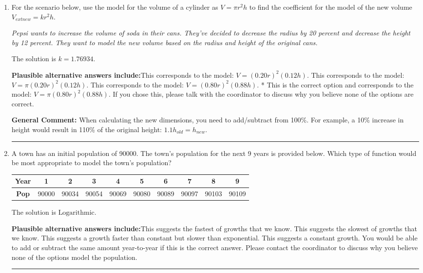 \documentclass{extbook}[14pt]
\newcommand{\litem}[1]{\item #1

\rule{\textwidth}{0.4pt}}
\begin{document}
\begin{enumerate}\litem{
For the scenario below, use the model for the volume of a cylinder as $V = \pi r^2 h$ to find the coefficient for the model of the new volume $V_{	ext{new}} = k r^2 h$.

\begin{center}
    \textit{ Pepsi wants to increase the volume of soda in their cans. They've decided to decrease the radius by 20 percent and decrease the height by 12 percent. They want to model the new volume based on the radius and height of the original cans. }
\end{center}
The solution is \( k = 1.76934 \).\begin{enumerate}[label=\Alph*.]
\textbf{Plausible alternative answers include:}This corresponds to the model: $V = (0.20 r)^2 (0.12 h)$.
This corresponds to the model: $V = \pi (0.20 r)^2 (0.12 h)$.
This corresponds to the model: $V = (0.80 r)^2 (0.88 h)$.
* This is the correct option and corresponds to the model: $V = \pi (0.80 r)^2 (0.88 h)$.
If you chose this, please talk with the coordinator to discuss why you believe none of the options are correct.
\end{enumerate}

\textbf{General Comment:} When calculating the new dimensions, you need to add/subtract from 100\%. For example, a 10\% increase in height would result in 110\% of the original height: $1.1h_{old} = h_{new}$.
}
\litem{
A town has an initial population of 90000. The town's population for the next 9 years is provided below. Which type of function would be most appropriate to model the town's population?


\begin{tabular}{c|c|c|c|c|c|c|c|c|c}
\textbf{Year} &1 &2 &3 &4 &5 &6 &7 &8 &9\tabularnewline \hline
\textbf{Pop} &90000 &90034 &90054 &90069 &90080 &90089 &90097 &90103 &90109\end{tabular}The solution is \( \text{Logarithmic} \).\begin{enumerate}[label=\Alph*.]
\textbf{Plausible alternative answers include:}This suggests the fastest of growths that we know.
This suggests the slowest of growths that we know.
This suggests a growth faster than constant but slower than exponential.
This suggests a constant growth. You would be able to add or subtract the same amount year-to-year if this is the correct answer.
Please contact the coordinator to discuss why you believe none of the options model the population.
\end{enumerate}

}
\end{enumerate}
\end{document}

